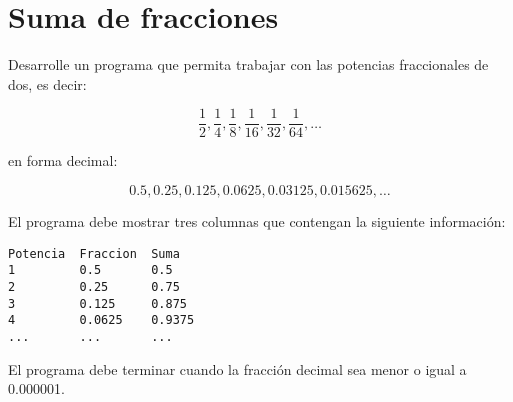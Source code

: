 \section{Suma de fracciones}

Desarrolle un programa que permita trabajar con las potencias
fraccionales de dos, es decir:

\[\frac{1}{2}, \frac{1}{4}, \frac{1}{8}, \frac{1}{16}, \frac{1}{32}, \frac{1}{64}, \ldots\]

en forma decimal:

\[0.5, 0.25, 0.125, 0.0625, 0.03125, 0.015625, \ldots\]

El programa debe mostrar tres columnas que contengan la siguiente
información:

\begin{lstlisting}
Potencia  Fraccion  Suma
1         0.5       0.5
2         0.25      0.75
3         0.125     0.875
4         0.0625    0.9375
...       ...       ...
\end{lstlisting}

El programa debe terminar cuando la fracción decimal sea menor o igual a
0.000001.
